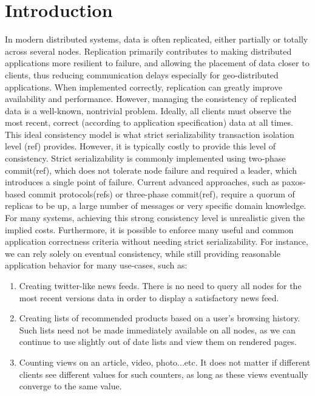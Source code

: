 

\section{Introduction}

In modern distributed systems, data is often replicated, either partially or totally 
across several nodes. Replication primarily contributes to making distributed 
applications more resilient to failure, and allowing the placement of data closer to clients, 
thus reducing communication delays especially for geo-distributed applications. 
When implemented correctly, replication can greatly improve availability and performance.
However, managing the consistency of replicated data is a well-known, nontrivial
problem. Ideally, all clients must observe the most recent, correct (according to
application specification) data at all times. This ideal consistency model is what
strict serializability transaction isolation level (ref) provides. However, it
is typically costly to provide this level of consistency.  Strict
serializability is commonly implemented using two-phase commit(ref), which does not
tolerate node failure and required a leader, which introduces a single point of
failure. Current advanced
approaches, such as paxos-based commit protocols(refs) or three-phase commit(ref),
require a quorum of replicas to be up, a large number of messages or very
specific domain knowledge. \\  %

For many systems, achieving this strong consistency level is unrealistic given
the implied costs. Furthermore, it is possible to enforce many useful and common
application correctness criteria without needing strict serializability. 
For instance, we can rely solely on eventual consistency, while still providing
reasonable application behavior for many use-cases, such as:

\begin{enumerate}
\item Creating twitter-like news feeds. There is no need to query all nodes for
the most recent versions data in order to display a satisfactory news feed.

\item Creating lists of recommended products based on a user's browsing history.
Such lists need not be made immediately available on all nodes, as we can
continue to use slightly out of date lists and view them on rendered pages.

\item Counting views on an article, video, photo...etc. It does not matter if
different clients see different values for such counters, as long as these
views eventually converge to the same value.
\end{enumerate}

